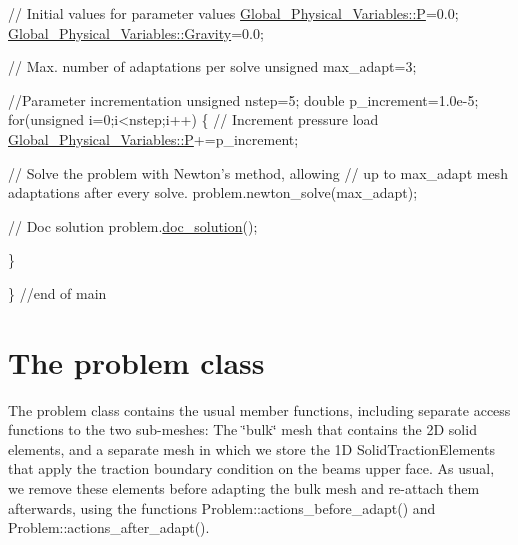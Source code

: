 \begin{DoxyCodeInclude}

 \textcolor{comment}{// Initial values for parameter values}
 \hyperlink{namespaceGlobal__Physical__Variables_a23c2ade6398f54040b869f7f3a2bcc4b}{Global\_Physical\_Variables::P}=0.0; 
 \hyperlink{namespaceGlobal__Physical__Variables_a8b80d3e8d63b8d0a0ed435a2dd7fe2ad}{Global\_Physical\_Variables::Gravity}=0.0;

 \textcolor{comment}{// Max. number of adaptations per solve}
 \textcolor{keywordtype}{unsigned} max\_adapt=3;
 
 \textcolor{comment}{//Parameter incrementation}
 \textcolor{keywordtype}{unsigned} nstep=5; 
 \textcolor{keywordtype}{double} p\_increment=1.0e-5;   
 \textcolor{keywordflow}{for}(\textcolor{keywordtype}{unsigned} i=0;i<nstep;i++)
  \{
   \textcolor{comment}{// Increment pressure load}
   \hyperlink{namespaceGlobal__Physical__Variables_a23c2ade6398f54040b869f7f3a2bcc4b}{Global\_Physical\_Variables::P}+=p\_increment;

   \textcolor{comment}{// Solve the problem with Newton's method, allowing}
   \textcolor{comment}{// up to max\_adapt mesh adaptations after every solve.}
   problem.newton\_solve(max\_adapt);

   \textcolor{comment}{// Doc solution}
   problem.\hyperlink{classCantileverProblem_a7571348f8724e71be4e67dc64cea3877}{doc\_solution}();

  \}
 
\} \textcolor{comment}{//end of main}

\end{DoxyCodeInclude}




 

\hypertarget{index_class}{}\section{The problem class}\label{index_class}
The problem class contains the usual member functions, including separate access functions to the two sub-\/meshes\+: The \char`\"{}bulk\char`\"{} mesh that contains the 2D solid elements, and a separate mesh in which we store the 1D {\ttfamily Solid\+Traction\+Elements} that apply the traction boundary condition on the beam\textquotesingle{}s upper face. As usual, we remove these elements before adapting the bulk mesh and re-\/attach them afterwards, using the functions {\ttfamily Problem\+::actions\+\_\+before\+\_\+adapt()} and {\ttfamily Problem\+::actions\+\_\+after\+\_\+adapt()}.

